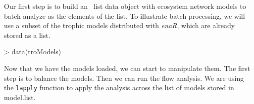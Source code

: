 \documentclass[article]{jss}
\newcommand{\R}{\proglang{R}}
\begin{document}
Our first step is to build an \R\ list data object with ecosystem
network models to batch analyze as the elements of the list.  To
illustrate batch processing, we will use a subset of the trophic models
distributed with \textit{enaR}, which are already stored as a list.

\begin{Schunk}
\begin{Sinput}
> data(troModels)
\end{Sinput}
\end{Schunk}

Now that we have the models loaded, we can start to manipulate
them.  The first step is to balance the models.  Then we can run the
flow analysis.  We are using the \texttt{lapply} function to apply the
analysis across the list of models stored in model.list.

\end{document}
